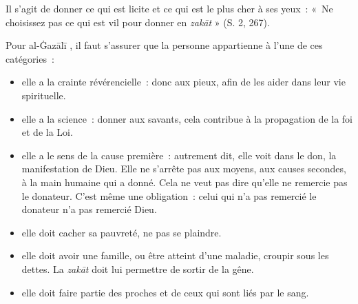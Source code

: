 Il s'agit de donner ce qui est licite et ce qui est le plus cher à ses
yeux~: «~Ne choisissez pas ce qui est vil pour donner en \emph{zakāt} »
(S. 2, 267).


Pour al-Ġazālī \label{theol:AlGazali15}, il faut s'assurer que la personne appartienne à l'une de
ces catégories~:

\begin{itemize}
\item
  elle a la crainte révérencielle~: donc aux pieux, afin de les aider
  dans leur vie spirituelle.
\item
  elle a la science~: donner aux savants, cela contribue à la
  propagation de la foi et de la Loi.
\item
  elle a le sens de la cause première~: autrement dit, elle voit dans le
  don, la manifestation de Dieu. Elle ne s'arrête pas aux moyens, aux
  causes secondes, à la main humaine qui a donné. Cela ne veut pas dire
  qu'elle ne remercie pas le donateur. C'est même une obligation~: celui
  qui n'a pas remercié le donateur n'a pas remercié Dieu.
\item
  elle doit cacher sa pauvreté, ne pas se plaindre.
\item
  elle doit avoir une famille, ou être atteint d'une maladie, croupir
  sous les dettes. La \emph{zakāt} doit lui permettre de sortir de la
  gêne.
\item
  elle doit faire partie des proches et de ceux qui sont liés par le
  sang.
\end{itemize}





